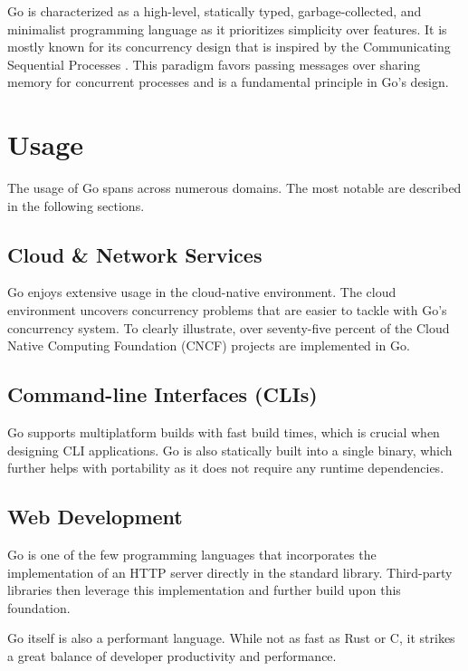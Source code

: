 \documentclass[
  digital,
  color,
  oneside,
  nosansbold,
  nocolorbold,
  nolof,
  nolot,
]{fithesis4}
\begin{document}
Go is characterized as a high-level, statically typed, garbage-collected, and minimalist programming language as it prioritizes simplicity over features. It is mostly known for its concurrency design that is inspired by the Communicating Sequential Processes \cite{csp}. This paradigm favors passing messages over sharing memory for concurrent processes and is a fundamental principle in Go's design.

\section{Usage}

The usage of Go spans across numerous domains. The most notable are described in the following sections.

\subsection{Cloud \& Network Services}

Go enjoys extensive usage in the cloud-native environment. The cloud environment uncovers concurrency problems that are easier to tackle with Go's concurrency system. To clearly illustrate, over seventy-five percent of the Cloud Native Computing Foundation (CNCF)\cite{cncf} projects are implemented in Go. \cite{go-cloud}

\subsection{Command-line Interfaces (CLIs)}\label{go-cli}

Go supports multiplatform builds with fast build times, which is crucial when designing CLI applications. Go is also statically built into a single binary, which further helps with portability as it does not require any runtime dependencies. \cite{go-cli}

\subsection{Web Development}\label{go-web}

Go is one of the few programming languages that incorporates the implementation of an HTTP server directly in the standard library. Third-party libraries then leverage this implementation and further build upon this foundation. 

Go itself is also a performant language. While not as fast as Rust\cite{rust} or C\cite{c}, it strikes a great balance of developer productivity and performance. \cite{benchmarks-game,go-web}
\end{document}
